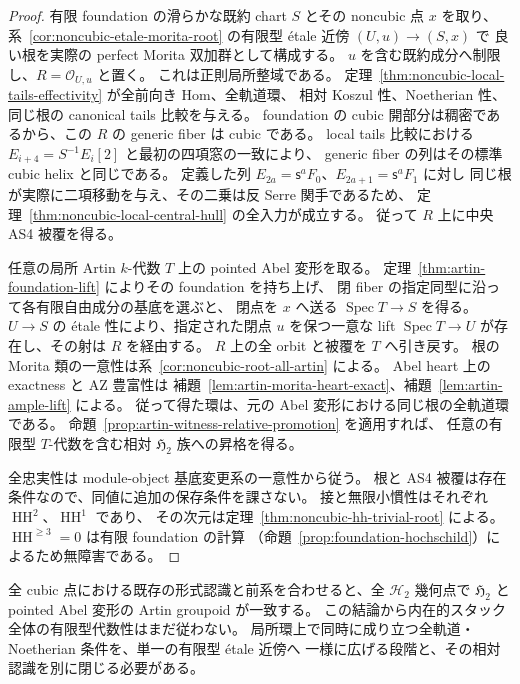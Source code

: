 \begin{proof}
有限 foundation の滑らかな既約 chart \(S\) とその noncubic 点 \(x\) を取り、
系~\ref{cor:noncubic-etale-morita-root} の有限型 étale 近傍 \((U,u)\to(S,x)\) で
良い根を実際の perfect Morita 双加群として構成する。
\(u\) を含む既約成分へ制限し、\(R=\mathcal O_{U,u}\) と置く。
これは正則局所整域である。
定理~\ref{thm:noncubic-local-tails-effectivity} が全前向き Hom、全軌道環、
相対 Koszul 性、Noetherian 性、同じ根の canonical tails 比較を与える。
foundation の cubic 開部分は稠密であるから、この \(R\) の generic fiber は cubic である。
local tails 比較における \(E_{i+4}=S^{-1}E_i[2]\) と最初の四項窓の一致により、
generic fiber の列はその標準 cubic helix と同じである。
定義した列 \(E_{2a}=\mathsf s^aF_0\)、\(E_{2a+1}=\mathsf s^aF_1\) に対し
同じ根が実際に二項移動を与え、その二乗は反 Serre 関手であるため、
定理~\ref{thm:noncubic-local-central-hull} の全入力が成立する。
従って \(R\) 上に中央 AS4 被覆を得る。

任意の局所 Artin \(k\)-代数 \(T\) 上の pointed Abel 変形を取る。
定理~\ref{thm:artin-foundation-lift} によりその foundation を持ち上げ、
閉 fiber の指定同型に沿って各有限自由成分の基底を選ぶと、
閉点を \(x\) へ送る \(\operatorname{Spec}T\to S\) を得る。
\(U\to S\) の étale 性により、指定された閉点 \(u\) を保つ一意な lift
\(\operatorname{Spec}T\to U\) が存在し、その射は \(R\) を経由する。
\(R\) 上の全 orbit と被覆を \(T\) へ引き戻す。
根の Morita 類の一意性は系~\ref{cor:noncubic-root-all-artin} による。
Abel heart 上の exactness と AZ 豊富性は
補題~\ref{lem:artin-morita-heart-exact}、補題~\ref{lem:artin-ample-lift} による。
従って得た環は、元の Abel 変形における同じ根の全軌道環である。
命題~\ref{prop:artin-witness-relative-promotion} を適用すれば、
任意の有限型 \(T\)-代数を含む相対 \(\mathfrak H_2\) 族への昇格を得る。

全忠実性は module-object 基底変更系の一意性から従う。
根と AS4 被覆は存在条件なので、同値に追加の保存条件を課さない。
接と無限小慣性はそれぞれ \(\operatorname{HH}^2\)、\(\operatorname{HH}^1\) であり、
その次元は定理~\ref{thm:noncubic-hh-trivial-root} による。
\(\operatorname{HH}^{\ge3}=0\) は有限 foundation の計算
（命題~\ref{prop:foundation-hochschild}）によるため無障害である。
\end{proof}

\begin{remark}[形式的完了と代数性の区別]
全 cubic 点における既存の形式認識と前系を合わせると、全 \(\mathcal H_2\) 幾何点で
\(\mathfrak H_2\) と pointed Abel 変形の Artin groupoid が一致する。
この結論から内在的スタック全体の有限型代数性はまだ従わない。
局所環上で同時に成り立つ全軌道・Noetherian 条件を、単一の有限型 étale 近傍へ
一様に広げる段階と、その相対認識を別に閉じる必要がある。
\end{remark}

